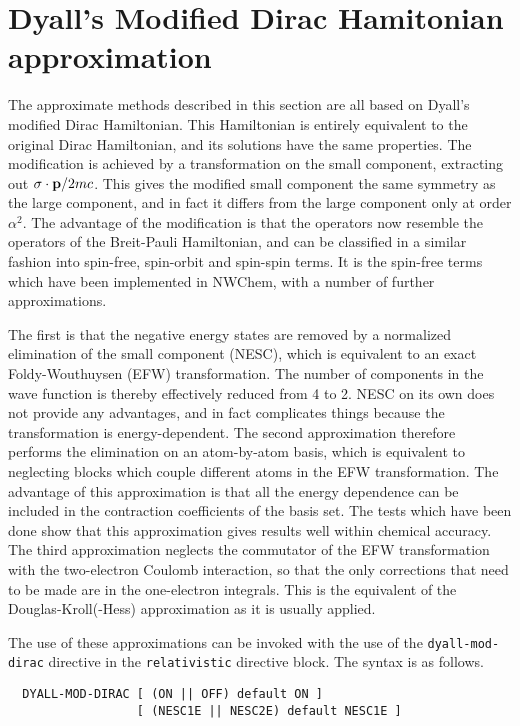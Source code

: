 \section{Dyall's Modified Dirac Hamitonian approximation}
\label{sec:dyall-mod-dir}


The approximate methods described in this section are all based on Dyall's
modified Dirac Hamiltonian. This Hamiltonian is entirely equivalent to the
original Dirac Hamiltonian, and its solutions have the same properties.
The modification is achieved by a transformation on the small component,
extracting out $\sigma\cdot{\bf p}/2mc$. This gives the modified small
component the same symmetry as the large component, and in fact it differs
from the large component only at order $\alpha^2$.  The advantage of the
modification is that the operators now resemble the operators of the
Breit-Pauli Hamiltonian, and can be classified in a similar fashion into
spin-free, spin-orbit and spin-spin terms. It is the spin-free terms which
have been implemented in NWChem, with a number of further approximations.

The first is that the negative energy states are removed by a normalized
elimination of the small component (NESC), which is equivalent to an exact
Foldy-Wouthuysen (EFW) transformation. The number of components in the wave
function is thereby effectively reduced from 4 to 2. NESC on its own does
not provide any advantages, and in fact complicates things because the
transformation is energy-dependent. The second approximation therefore
performs the elimination on an atom-by-atom basis, which is equivalent to
neglecting blocks which couple different atoms in the EFW transformation.
The advantage of this approximation is that all the energy dependence can be
included in the contraction coefficients of the basis set.  The tests which
have been done show that this approximation gives results well within
chemical accuracy. The third approximation neglects the commutator of the
EFW transformation with the two-electron Coulomb interaction, so that the
only corrections that need to be made are in the one-electron integrals.
This is the equivalent of the Douglas-Kroll(-Hess) approximation as it is
usually applied.

The use of these approximations can be invoked with the use of the
\verb+dyall-mod-dirac+ directive in the \verb+relativistic+ directive block.
The syntax is as follows.

\begin{verbatim}
  DYALL-MOD-DIRAC [ (ON || OFF) default ON ] 
                  [ (NESC1E || NESC2E) default NESC1E ]

\end{verbatim}

